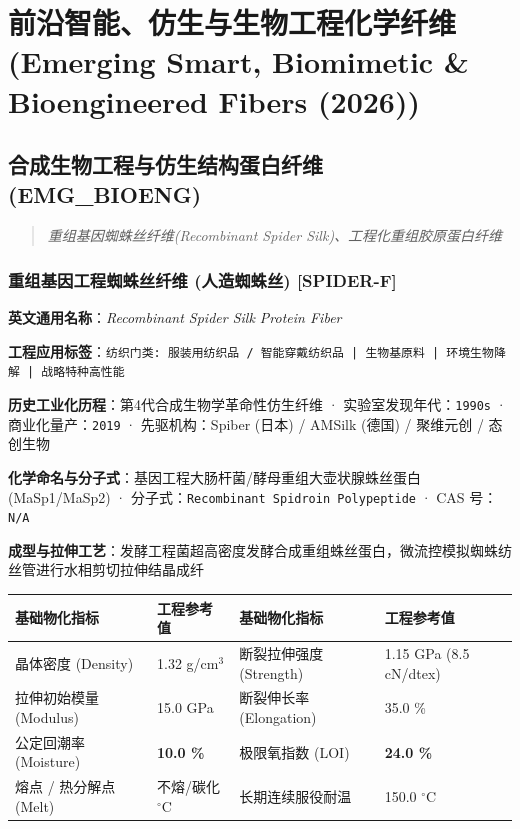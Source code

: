 \documentclass[11pt,openright,twoside,UTF8]{ctexbook}
\begin{document}
\part{前沿智能、仿生与生物工程化学纤维 (Emerging Smart, Biomimetic \& Bioengineered Fibers (2026))}

\chapter{合成生物工程与仿生结构蛋白纤维 (EMG\_BIOENG)}
\begin{quote}
\small\itshape
重组基因蜘蛛丝纤维(Recombinant Spider Silk)、工程化重组胶原蛋白纤维
\end{quote}

\section{重组基因工程蜘蛛丝纤维 (人造蜘蛛丝) [SPIDER-F]}
\label{sec:spider-f}

\noindent\textbf{英文通用名称}：\textit{Recombinant Spider Silk Protein Fiber}\par
\noindent\textbf{工程应用标签}：\texttt{纺织门类: 服装用纺织品 / 智能穿戴纺织品 | 生物基原料 | 环境生物降解 | 战略特种高性能}\par
\noindent\textbf{历史工业化历程}：第4代合成生物学革命性仿生纤维 · 实验室发现年代：\texttt{1990s} · 商业化量产：\texttt{2019} · 先驱机构：Spiber (日本) / AMSilk (德国) / 聚维元创 / 态创生物\par
\noindent\textbf{化学命名与分子式}：基因工程大肠杆菌/酵母重组大壶状腺蛛丝蛋白 (MaSp1/MaSp2) · 分子式：\texttt{Recombinant Spidroin Polypeptide} · CAS 号：\texttt{N/A}\par
\noindent\textbf{成型与拉伸工艺}：发酵工程菌超高密度发酵合成重组蛛丝蛋白，微流控模拟蜘蛛纺丝管进行水相剪切拉伸结晶成纤\par

\vspace{0.15cm}
\begin{center}
\small
\begin{tabularx}{\textwidth}{p{3.8cm}Xp{3.8cm}X}
\toprule
\textbf{基础物化指标} & \textbf{工程参考值} & \textbf{基础物化指标} & \textbf{工程参考值} \\
\midrule
晶体密度 (Density) & 1.32 g/cm$^3$ & 断裂拉伸强度 (Strength) & 1.15 GPa (8.5 cN/dtex) \\
拉伸初始模量 (Modulus) & 15.0 GPa & 断裂伸长率 (Elongation) & 35.0 \% \\
公定回潮率 (Moisture) & \textbf{10.0 \%} & 极限氧指数 (LOI) & \textbf{24.0 \%} \\
熔点 / 热分解点 (Melt) & 不熔/碳化 $^\circ\mathrm{C}$ & 长期连续服役耐温 & 150.0 $^\circ\mathrm{C}$ \\
\bottomrule
\end{tabularx}
\end{center}
\vspace{0.15cm}
\end{document}
